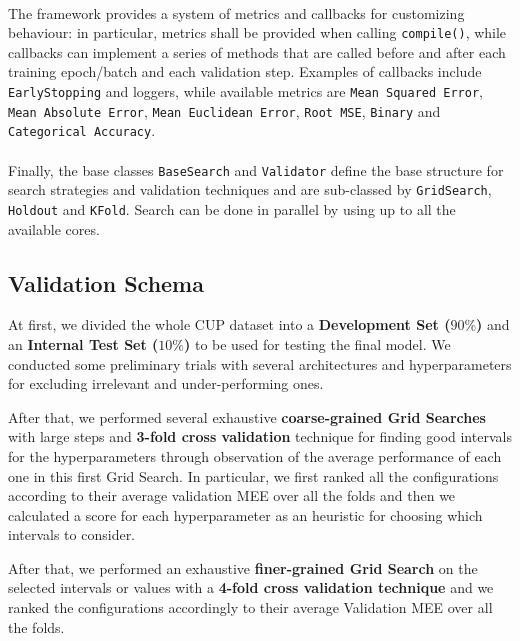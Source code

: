 \paragraph{}

The framework provides a system of metrics and callbacks for customizing behaviour: in particular, metrics shall be provided when calling \texttt{compile()}, while callbacks can implement a series of methods that are called before and after each training epoch/batch and each validation step. Examples of callbacks include \texttt{EarlyStopping} and loggers, while available metrics are \texttt{Mean Squared Error}, \texttt{Mean Absolute Error}, \texttt{Mean Euclidean Error}, \texttt{Root MSE}, \texttt{Binary} and \texttt{Categorical Accuracy}.

\paragraph{}

Finally, the base classes \texttt{BaseSearch} and \texttt{Validator} define the base structure for search strategies and validation techniques and are sub-classed by \texttt{GridSearch}, \texttt{Holdout} and \texttt{KFold}. Search can be done in parallel by using up to all the available cores.

\subsection{Validation Schema}
At first, we divided the whole CUP dataset into a \textbf{Development Set ($90\%$)} and an \textbf{Internal Test Set ($10\%$)} to be used for testing the final model. We conducted some preliminary trials with several architectures and hyperparameters for excluding irrelevant and under-performing ones.

After that, we performed several exhaustive \textbf{coarse-grained Grid Searches} with large steps and \textbf{3-fold cross validation} technique for finding good intervals for the hyperparameters through observation of the average performance of each one in this first Grid Search.
In particular, we first ranked all the configurations according to their average validation MEE over all the folds and then we calculated a score for each hyperparameter as an heuristic for choosing which intervals to consider.

After that, we performed an exhaustive \textbf{finer-grained Grid Search} on the selected intervals or values with a \textbf{4-fold cross validation technique} and we ranked the configurations accordingly to their average Validation MEE over all the folds.

